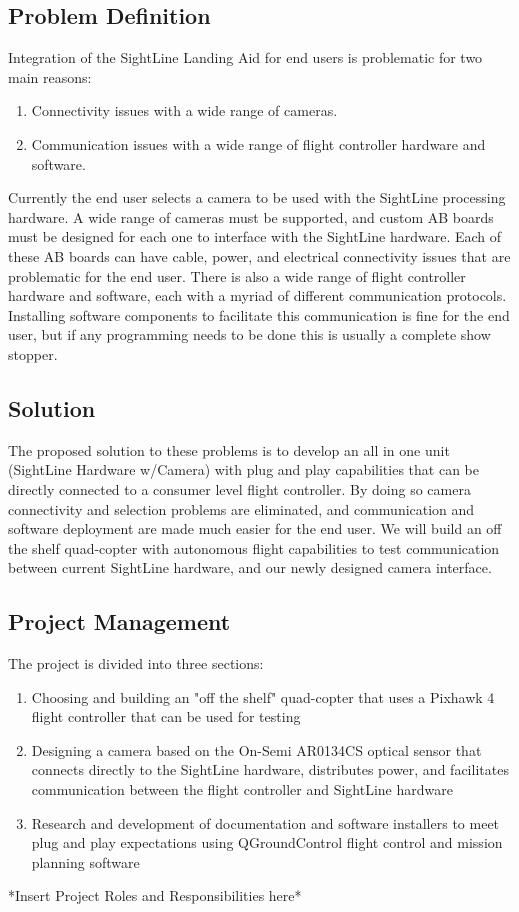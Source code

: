 \documentclass[11pt]{article}
\begin{document}
\subsection{Problem Definition}

Integration of the SightLine Landing Aid for end users is problematic for two main reasons: 

\begin{enumerate}
\item Connectivity issues with a wide range of cameras. 
\item Communication issues with a wide range of flight controller hardware and software.
\end{enumerate} 

Currently the end user selects a camera to be used with the SightLine processing hardware. A wide range of cameras must be supported, and custom AB boards must be designed for each one to interface with the SightLine hardware. Each of these AB boards can have cable, power, and electrical connectivity issues that are problematic for the end user.
There is also a wide range of flight controller hardware and software, each with a myriad of different communication protocols. Installing software components to facilitate this communication is fine for the end user, but if any programming needs to be done this is usually a complete show stopper. 

\subsection{Solution}

The proposed solution to these problems is to develop an all in one unit (SightLine Hardware w/Camera) with plug and play capabilities that can be directly connected to a consumer level flight controller. By doing so camera connectivity and selection problems are eliminated, and communication and software deployment are made much easier for the end user. We will build an off the shelf quad-copter with autonomous flight capabilities to test communication between current SightLine hardware, and our newly designed camera interface.

\subsection{Project Management}

The project is divided into three sections:
\begin{enumerate}
 \item Choosing and building an "off the shelf" quad-copter that uses a Pixhawk 4 flight controller that can be used for testing
 \item Designing a camera based on the On-Semi AR0134CS optical sensor that connects directly to the SightLine hardware, distributes power, and facilitates communication  between the flight controller and SightLine hardware
 \item Research and development of documentation and software installers to meet plug and play expectations using QGroundControl flight control and mission planning software
\end{enumerate}
*Insert Project Roles and Responsibilities here*
\end{document}
